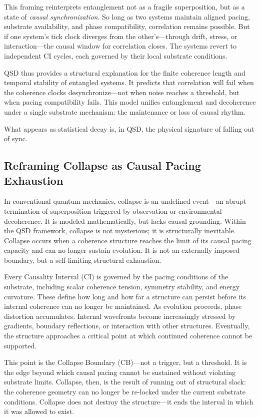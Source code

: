 \documentclass[preprints,article,submit,pdftex,moreauthors]{Definitions/mdpi}
\begin{document}
This framing reinterprets entanglement not as a fragile superposition, but as a state of \emph{causal synchronization}. So long as two systems maintain aligned pacing, substrate availability, and phase compatibility, correlation remains possible. But if one system’s tick clock diverges from the other’s—through drift, stress, or interaction—the causal window for correlation closes. The systems revert to independent CI cycles, each governed by their local substrate conditions.

QSD thus provides a structural explanation for the finite coherence length and temporal stability of entangled systems. It predicts that correlation will fail when the coherence clocks desynchronize—not when noise reaches a threshold, but when pacing compatibility fails. This model unifies entanglement and decoherence under a single substrate mechanism: the maintenance or loss of causal rhythm.

What appears as statistical decay is, in QSD, the physical signature of falling out of sync.

\subsection{Reframing Collapse as Causal Pacing Exhaustion}

In conventional quantum mechanics, collapse is an undefined event—an abrupt termination of superposition triggered by observation or environmental decoherence. It is modeled mathematically, but lacks causal grounding. Within the QSD framework, collapse is not mysterious; it is structurally inevitable. Collapse occurs when a coherence structure reaches the limit of its causal pacing capacity and can no longer sustain evolution. It is not an externally imposed boundary, but a self-limiting structural exhaustion.

Every Causality Interval (CI) is governed by the pacing conditions of the substrate, including scalar coherence tension, symmetry stability, and energy curvature. These define how long and how far a structure can persist before its internal coherence can no longer be maintained. As evolution proceeds, phase distortion accumulates. Internal wavefronts become increasingly stressed by gradients, boundary reflections, or interaction with other structures. Eventually, the structure approaches a critical point at which continued coherence cannot be supported.

This point is the Collapse Boundary (CB)—not a trigger, but a threshold. It is the edge beyond which causal pacing cannot be sustained without violating substrate limits. Collapse, then, is the result of running out of structural slack: the coherence geometry can no longer be re-locked under the current substrate conditions. Collapse does not destroy the structure—it ends the interval in which it was allowed to exist.
\end{document}
